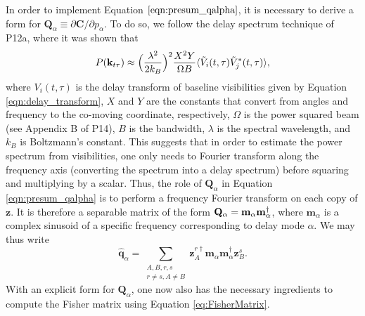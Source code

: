 \documentclass[twocolumn,numberedappendix]{emulateapj} \shorttitle{New Limits on the 21 cm Power Spectrum at $z=8.4$}
\newcommand{\qhat}{\hat{\mathbf{q}}}
\begin{document}
In order to implement Equation $\eqref{eqn:presum_qalpha}$, it is necessary to derive a form for
$\mathbf{Q}_\alpha \equiv \partial \mathbf{C} / \partial p_\alpha$. To do so, we follow the delay
spectrum technique of P12a, where it was shown that
\begin{equation}\label{eqn:delay_pspec}
    P(\mathbf{k}_{t\tau}) \approx
\Big(\frac{\lambda^{2}}{2k_{B}}\Big)^{2}\frac{X^{2}Y}{\Omega
B}\expval{\tilde{V}_{i}(t,\tau)\tilde{V}_{j}^{*}(t,\tau)},
\end{equation}
where $V_{i}(t,\tau)$ is the delay transform of baseline visibilities given by Equation \eqref{eqn:delay_transform}, $X$ and
$Y$ are the constants that convert from angles and frequency to the co-moving
coordinate, respectively, $\Omega$ is the power squared beam (see Appendix B of
P14), $B$ is the bandwidth, $\lambda$ is the spectral wavelength, and $k_{B}$ is Boltzmann's constant.
This suggests that in order to estimate the power spectrum from visibilities, one only needs
to Fourier transform along the frequency axis (converting the spectrum into a delay spectrum)
before squaring and multiplying by a scalar. Thus, the role of $\mathbf{Q}_\alpha$ in Equation \eqref{eqn:presum_qalpha} is to perform a frequency Fourier transform on each copy of
$\mathbf{z}$. It is therefore a separable matrix of the form $\mathbf{Q}_{\alpha} =
\mathbf{m}_{\alpha}\mathbf{m}_{\alpha}^{\dagger}$, where $\mathbf{m}_{\alpha}$ is a
complex sinusoid of a specific frequency corresponding to delay mode $\alpha$.
We may thus write
\begin{equation}
    \qhat_{\alpha} =
\sum_{\substack{A,B,r,s\\r\ne{s},A\ne{B}}}\mathbf{z}^{r\dagger}_{A}\mathbf{m}_{\alpha}\mathbf{m}_{\alpha}^{\dagger} \mathbf{z}^{s}_{B}.
\end{equation}
With an explicit form for $\mathbf{Q}_\alpha$, one now also has the necessary ingredients
to compute the Fisher matrix using Equation \eqref{eq:FisherMatrix}.
\end{document}

